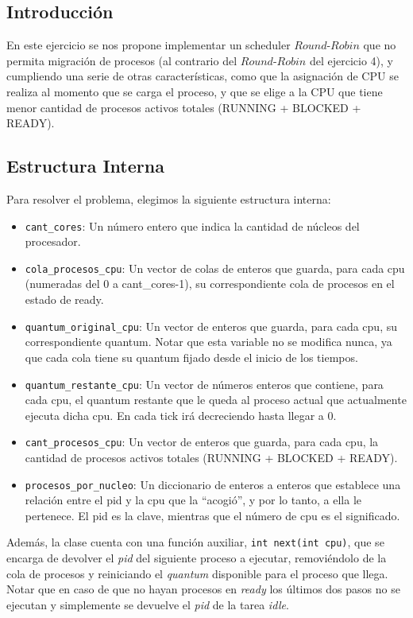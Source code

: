 \subsection{Introducci\'on} En este ejercicio se nos propone implementar un scheduler $Round$-$Robin$ que no permita migraci\'on de procesos (al contrario del $Round$-$Robin$ del ejercicio 4), y cumpliendo una serie de otras caracter\'isticas, como que la asignaci\'on de CPU se realiza al momento que se carga el proceso, y que se elige a la CPU que tiene menor cantidad de procesos activos totales (RUNNING + BLOCKED + READY).

\subsection{Estructura Interna} Para resolver el problema, elegimos la siguiente estructura interna:
\begin{itemize}
	\item \texttt{cant\_cores}: Un n\'umero entero que indica la cantidad de n\'ucleos del procesador.
	\item \texttt{cola\_procesos\_cpu}: Un vector de colas de enteros que guarda, para cada cpu (numeradas del 0 a cant\_cores-1), su correspondiente cola de procesos en el estado de ready.
	\item \texttt{quantum\_original\_cpu}: Un vector de enteros que guarda, para cada cpu, su correspondiente quantum. Notar que esta variable no se modifica nunca, ya que cada cola tiene su quantum fijado desde el inicio de los tiempos.
	\item \texttt{quantum\_restante\_cpu}: Un vector de n\'umeros enteros que contiene, para cada cpu, el quantum restante que le queda al proceso actual que actualmente ejecuta dicha cpu. En cada tick ir\'a decreciendo hasta llegar a 0.
	\item \texttt{cant\_procesos\_cpu}: Un vector de enteros que guarda, para cada cpu, la cantidad de procesos activos totales (RUNNING + BLOCKED + READY).
	\item \texttt{procesos\_por\_nucleo}: Un diccionario de enteros a enteros que establece una relaci\'on entre el pid y la cpu que la ``acogió'', y por lo tanto, a ella le pertenece. El pid es la clave, mientras que el n\'umero de cpu es el significado.
\end{itemize}

Además, la clase cuenta con una función auxiliar, \texttt{int next(int cpu)}, que se encarga de devolver el \emph{pid} del siguiente proceso a ejecutar, removiéndolo de la cola de procesos y reiniciando el \emph{quantum} disponible para el proceso que llega. Notar que en caso de que no hayan procesos en \emph{ready} los últimos dos pasos no se ejecutan y simplemente se devuelve el \emph{pid} de la tarea \emph{idle}.

